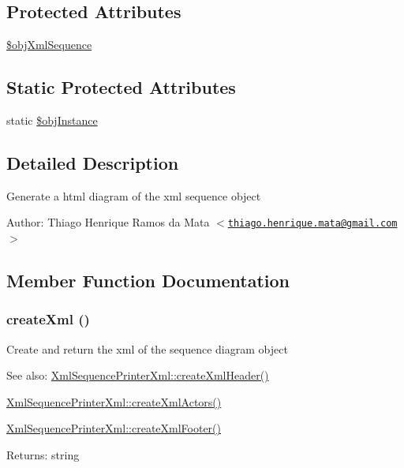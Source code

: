 \subsection*{Protected Attributes}
\begin{CompactItemize}
\item 
\hyperlink{class_xml_sequence_printer_xml_eefa469c1b13fe1fec040c910b720034}{\$objXmlSequence}
\end{CompactItemize}
\subsection*{Static Protected Attributes}
\begin{CompactItemize}
\item 
static \hyperlink{class_xml_sequence_printer_xml_917d057900327b25608ed26c927eac3b}{\$objInstance}
\end{CompactItemize}


\subsection{Detailed Description}
Generate a html diagram of the xml sequence object \begin{Desc}
\item[Author:]Thiago Henrique Ramos da Mata $<$\href{mailto:thiago.henrique.mata@gmail.com}{\tt thiago.henrique.mata@gmail.com}$>$ \end{Desc}


\subsection{Member Function Documentation}
\hypertarget{class_xml_sequence_printer_xml_f99cdc771342f41dfbecb336a90f48d2}{
\subsubsection[{createXml}]{\setlength{\rightskip}{0pt plus 5cm}createXml ()}}
\label{class_xml_sequence_printer_xml_f99cdc771342f41dfbecb336a90f48d2}


Create and return the xml of the sequence diagram object

\begin{Desc}
\item[See also:]\hyperlink{class_xml_sequence_printer_xml_df4117a74e93f6f53e068d0859691cce}{XmlSequencePrinterXml::createXmlHeader()} 

\hyperlink{class_xml_sequence_printer_xml_65c529c6ee2e9bbdfd1baa8a5a8fe1a5}{XmlSequencePrinterXml::createXmlActors()} 

\hyperlink{class_xml_sequence_printer_xml_c983c2020c960b39e98ed05baec4aedd}{XmlSequencePrinterXml::createXmlFooter()} \end{Desc}
\begin{Desc}
\item[Returns:]string \end{Desc}


